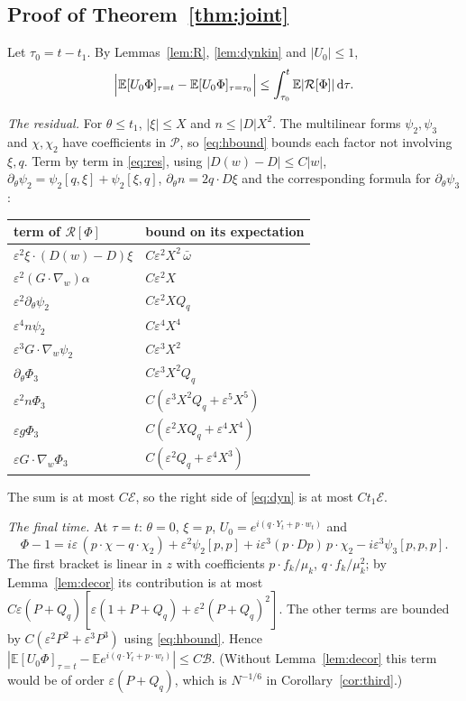 \documentclass[11pt]{article}
\newcommand{\dd}{\mathrm{d}}
\newcommand{\E}{\mathbb{E}}
\newcommand{\eps}{\varepsilon}
\newcommand{\cR}{\mathcal{R}}
\newcommand{\cP}{\mathcal{P}}
\theoremstyle{remark}
\begin{document}
\subsection{Proof of Theorem~\ref{thm:joint}}

Let $\tau_0 = t-t_1$. By Lemmas~\ref{lem:R}, \ref{lem:dynkin} and $|U_0|\le1$,
\begin{equation}
  \Bigl|\E[U_0\Phi]_{\tau=t} - \E[U_0\Phi]_{\tau=\tau_0}\Bigr|
  \le\int_{\tau_0}^t\E|\cR[\Phi]|\,\dd\tau .
  \label{eq:dyn}
\end{equation}

\emph{The residual.} For $\theta\le t_1$, $|\xi|\le X$ and
$n\le|D|X^2$. The multilinear forms $\psi_2,\psi_3$ and $\chi,\chi_2$ have
coefficients in $\cP$, so \eqref{eq:hbound} bounds each factor not involving
$\xi,q$. Term by term in \eqref{eq:res}, using
$|D(w)-D|\le C|w|$, $\partial_\theta\psi_2 = \psi_2[q,\xi]+\psi_2[\xi,q]$,
$\partial_\theta n = 2q\cdot D\xi$ and the corresponding formula for
$\partial_\theta\psi_3$:
\begin{center}
\renewcommand{\arraystretch}{1.25}
\begin{tabular}{ll}
  term of $\cR[\Phi]$ & bound on its expectation \\ \hline
  $\eps^2\xi\cdot(D(w)-D)\xi$ & $C\eps^2X^2\,\bar\omega$ \\
  $\eps^2(G\cdot\nabla_w)\alpha$ & $C\eps^2X$ \\
  $\eps^2\partial_\theta\psi_2$ & $C\eps^2XQ_q$ \\
  $\eps^4n\psi_2$ & $C\eps^4X^4$ \\
  $\eps^3G\cdot\nabla_w\psi_2$ & $C\eps^3X^2$ \\
  $\partial_\theta\Phi_3$ & $C\eps^3X^2Q_q$ \\
  $\eps^2n\Phi_3$ & $C(\eps^3X^2Q_q + \eps^5X^5)$ \\
  $\eps g\Phi_3$ & $C(\eps^2XQ_q + \eps^4X^4)$ \\
  $\eps G\cdot\nabla_w\Phi_3$ & $C(\eps^2Q_q + \eps^4X^3)$
\end{tabular}
\end{center}
The sum is at most $C\mathcal{E}$, so the right side of \eqref{eq:dyn} is at
most $Ct_1\mathcal{E}$.

\emph{The final time.} At $\tau=t$: $\theta=0$, $\xi=p$,
$U_0 = e^{i(q\cdot Y_t+p\cdot w_t)}$ and
\[
  \Phi - 1 = i\eps\,(p\cdot\chi - q\cdot\chi_2) + \eps^2\psi_2[p,p]
    + i\eps^3(p\cdot Dp)\,p\cdot\chi_2 - i\eps^3\psi_3[p,p,p].
\]
The first bracket is linear in $z$ with coefficients $p\cdot f_k/\mu_k$,
$q\cdot f_k/\mu_k^2$; by Lemma~\ref{lem:decor} its contribution is at most
$C\eps(P+Q_q)[\eps(1+P+Q_q)+\eps^2(P+Q_q)^2]$. The other terms are bounded by
$C(\eps^2P^2+\eps^3P^3)$ using \eqref{eq:hbound}. Hence
$|\E[U_0\Phi]_{\tau=t} - \E e^{i(q\cdot Y_t+p\cdot w_t)}|\le C\mathcal{B}$.
(Without Lemma~\ref{lem:decor} this term would be of order $\eps(P+Q_q)$,
which is $N^{-1/6}$ in Corollary~\ref{cor:third}.)
\end{document}
